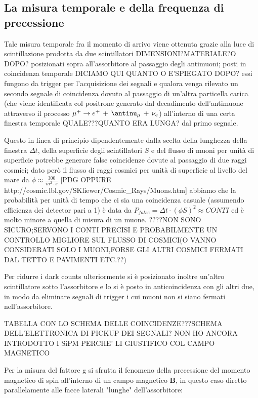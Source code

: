 \subsection{La misura temporale e della frequenza di precessione}
Tale misura temporale fra il momento di arrivo viene ottenuta grazie alla luce di scintillazione prodotta da due scintillatori DIMENSIONI?MATERIALE?O DOPO? posizionati sopra all'assorbitore al passaggio degli antimuoni; posti in coincidenza temporale DICIAMO QUI QUANTO O E'SPIEGATO DOPO? essi fungono da trigger per l'acquisizione dei segnali e qualora venga rilevato un secondo segnale di coincidenza dovuto al passaggio di un'altra particella carica (che viene identificata col positrone generato dal decadimento dell'antimuone attraverso il processo $\mu^+ \to e^+ \, + \, \antinu_{\mu} \, + \, \nu_e$) all'interno di una certa finestra temporale QUALE???QUANTO ERA LUNGA? dal primo segnale. \par
Questo in linea di principio dipendentemente dalla scelta della lunghezza della finestra $\Delta t$, della superficie degli scintillatori $S$ e del flusso di muoni per unità di superficie potrebbe generare false coincidenze dovute al passaggio di due raggi cosmici; dato però il flusso di raggi cosmici per unità di superficie al livello del mare da $\phi \approx\frac{300}{m^2 \cdot s}$ [PDG OPPURE http://cosmic.lbl.gov/SKliewer/Cosmic\_Rays/Muons.htm] abbiamo che la probabilità per unità di tempo che ci sia una coincidenza casuale (assumendo efficienza dei detector pari a 1) è data da $P_{false}=\Delta t \cdot (\phi S)^2 \approx CONTI$ ed è molto minore a quella di misura di un muone. ????NON SONO SICURO;SERVONO I CONTI PRECISI E PROBABILMENTE UN CONTROLLO MIGLIORE SUL FLUSSO DI COSMICI(O VANNO CONSIDERATI SOLO I MUONI,FORSE GLI ALTRI COSMICI FERMATI DAL TETTO E PAVIMENTI ETC.??) \par
Per ridurre i dark counts ulteriormente si è posizionato inoltre un'altro scintillatore sotto l'assorbitore e lo si è posto in anticoincidenza con gli altri due, in modo da eliminare segnali di trigger i cui muoni non si siano fermati nell'assorbitore. \par
TABELLA CON LO SCHEMA DELLE COINCIDENZE???SCHEMA DELL'ELETTRONICA DI PICKUP DEI SEGNALI? NON HO ANCORA INTRODOTTO I SiPM PERCHE' LI GIUSTIFICO COL CAMPO MAGNETICO \par
Per la misura del fattore g si sfrutta il fenomeno della precessione del momento magnetico di spin all'interno di un campo magnetico $\mathbf{B}$, in questo caso diretto parallelamente alle facce laterali "lunghe" dell'assorbitore:
